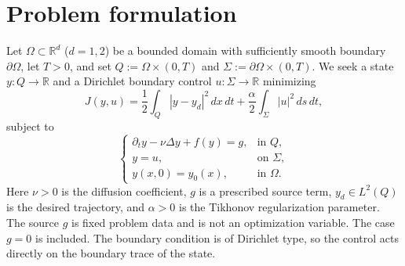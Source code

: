 \section{Problem formulation}

Let $\Omega\subset\mathbb{R}^d$ ($d=1,2$) be a bounded domain with sufficiently smooth boundary $\partial\Omega$, let $T>0$, and set $Q:=\Omega\times(0,T)$ and $\Sigma:=\partial\Omega\times(0,T)$. We seek a state $y:Q\to\mathbb{R}$ and a Dirichlet boundary control $u:\Sigma\to\mathbb{R}$ minimizing
\begin{equation}
\label{eq:cost}
J(y,u)=\frac12\int_Q |y-y_d|^2\,dx\,dt
       +\frac{\alpha}{2}\int_\Sigma |u|^2\,ds\,dt,
\end{equation}
subject to
\begin{equation}
\label{eq:state}
\begin{cases}
\partial_t y-\nu\Delta y+f(y)=g, & \text{in }Q,\\
y=u, & \text{on }\Sigma,\\
y(x,0)=y_0(x), & \text{in }\Omega.
\end{cases}
\end{equation}
Here $\nu>0$ is the diffusion coefficient, $g$ is a prescribed source term, $y_d\in L^2(Q)$ is the desired trajectory, and $\alpha>0$ is the Tikhonov regularization parameter. The source $g$ is fixed problem data and is not an optimization variable. The case $g=0$ is included. The boundary condition is of Dirichlet type, so the control acts directly on the boundary trace of the state.

